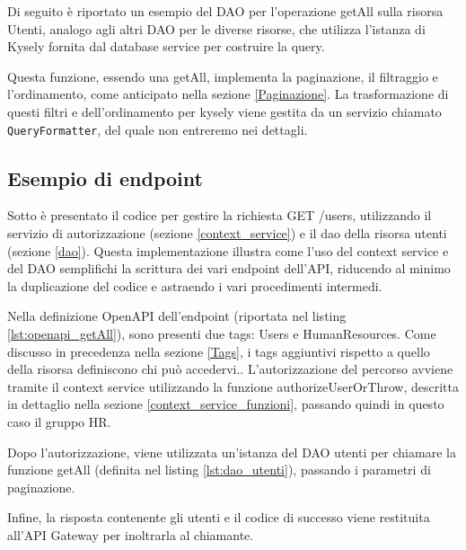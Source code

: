 Di seguito è riportato un esempio del DAO per l'operazione getAll sulla risorsa Utenti, analogo agli altri DAO per le diverse risorse, che utilizza l'istanza di Kysely fornita dal database service per costruire la query. 



Questa funzione,  essendo una getAll, implementa la paginazione, il filtraggio e l'ordinamento, come anticipato nella sezione \ref{Paginazione}.
La trasformazione di questi filtri e dell'ordinamento per kysely viene gestita da un servizio chiamato \texttt{QueryFormatter}, del quale non entreremo nei dettagli.


\subsection{Esempio di endpoint}
\label{esempio-endpoint}

Sotto è presentato il codice per gestire la richiesta GET /users, utilizzando il servizio di autorizzazione (sezione \ref{context_service}) e il dao della risorsa utenti (sezione \ref{dao}). Questa implementazione illustra come l'uso del context service e del DAO semplifichi la scrittura dei vari endpoint dell'API, riducendo al minimo la duplicazione del codice e astraendo i vari procedimenti intermedi.



Nella definizione OpenAPI dell'endpoint (riportata nel listing \ref{lst:openapi_getAll}), sono presenti due tags: Users e HumanResources. Come discusso in precedenza nella sezione \ref{Tags}, i tags aggiuntivi rispetto a quello della risorsa definiscono chi può accedervi.. L'autorizzazione del percorso avviene tramite il context service utilizzando la funzione authorizeUserOrThrow, descritta in dettaglio nella sezione \ref{context_service_funzioni}, passando quindi in questo caso il gruppo HR.

Dopo l'autorizzazione, viene utilizzata un'istanza del DAO utenti per chiamare la funzione getAll (definita nel listing \ref{lst:dao_utenti}), passando i parametri di paginazione. 

Infine, la risposta contenente gli utenti e il codice di successo viene restituita all'API Gateway per inoltrarla al chiamante.

